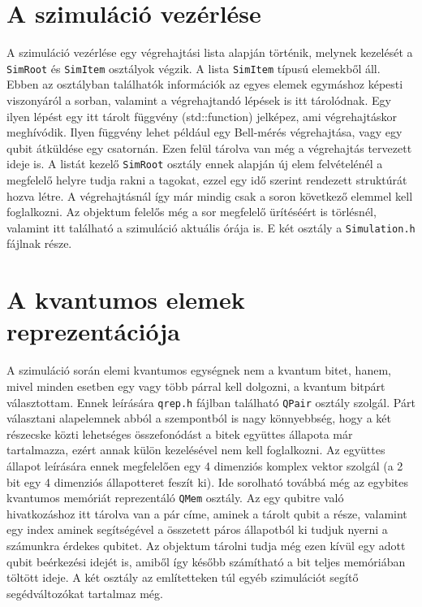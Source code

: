 \section{A szimuláció vezérlése}
A szimuláció vezérlése egy végrehajtási lista alapján történik, melynek kezelését a \texttt{SimRoot} és \texttt{SimItem} osztályok végzik. A lista \texttt{SimItem} típusú elemekből áll. Ebben az osztályban találhatók információk az egyes elemek egymáshoz képesti viszonyáról a sorban, valamint a végrehajtandó lépések is itt tárolódnak. Egy ilyen lépést egy itt tárolt függvény (std::function) jelképez, ami végrehajtáskor meghívódik. Ilyen függvény lehet például egy Bell-mérés végrehajtása, vagy egy qubit átküldése egy csatornán. Ezen felül tárolva van még a végrehajtás tervezett ideje is. A listát kezelő \texttt{SimRoot} osztály ennek alapján új elem felvételénél a megfelelő helyre tudja rakni a tagokat, ezzel egy idő szerint rendezett struktúrát hozva létre. A végrehajtásnál így már mindig csak a soron következő  elemmel kell foglalkozni.  Az objektum felelős még a sor megfelelő ürítéséért is törlésnél, valamint itt található a szimuláció aktuális órája is.
E két osztály a \texttt{Simulation.h} fájlnak része.

\section{A kvantumos elemek reprezentációja}

A szimuláció során elemi kvantumos egységnek nem a kvantum bitet, hanem, mivel minden esetben egy vagy több párral kell dolgozni, a kvantum bitpárt választottam. Ennek leírására \texttt{qrep.h} fájlban található \texttt{QPair} osztály szolgál. Párt választani alapelemnek abból a szempontból is nagy könnyebbség, hogy a két részecske közti lehetséges összefonódást a bitek együttes állapota már tartalmazza, ezért annak külön kezelésével nem kell foglalkozni. Az együttes állapot leírására ennek megfelelően egy 4 dimenziós komplex vektor szolgál (a 2 bit egy 4 dimenziós állapotteret feszít ki).  Ide sorolható továbbá még az egybites kvantumos memóriát reprezentáló \texttt{QMem} osztály. Az egy qubitre való hivatkozáshoz itt tárolva van a pár címe, aminek a tárolt qubit a része, valamint egy index aminek segítségével a összetett páros állapotból ki tudjuk nyerni a számunkra érdekes qubitet. Az objektum tárolni tudja még ezen kívül egy adott qubit beérkezési idejét is, amiből így később számítható a bit teljes memóriában töltött ideje. A két osztály az említetteken túl egyéb szimulációt segítő segédváltozókat tartalmaz még.

